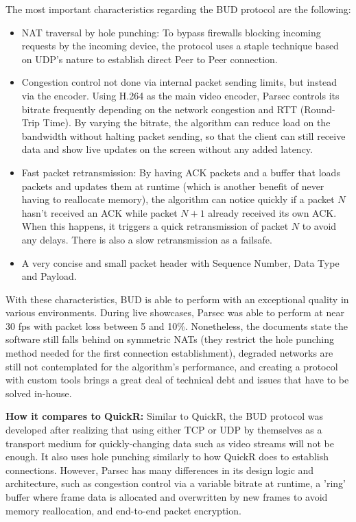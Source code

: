 \documentclass{article}
\begin{document}
        The most important characteristics regarding the BUD protocol are the following:
        \begin{itemize}
            \item NAT traversal by hole punching: To bypass firewalls blocking incoming requests by the incoming device, the protocol uses a staple technique based on UDP's nature to establish direct Peer to Peer connection.
            \item Congestion control not done via internal packet sending limits, but instead via the encoder. Using H.264 as the main video encoder, Parsec controls its bitrate frequently depending on the network congestion and RTT (Round-Trip Time). 
            By varying the bitrate, the algorithm can reduce load on the bandwidth without halting packet sending, so that the client can still receive data and show live updates on the screen without any added latency. 
            \item Fast packet retransmission: By having ACK packets and a buffer that loads packets and updates them at runtime (which is another benefit of never having to reallocate memory), the algorithm can notice quickly if a packet $N$ hasn't received an ACK while packet $N+1$ already received
            its own ACK. When this happens, it triggers a quick retransmission of packet $N$ to avoid any delays. There is also a slow retransmission as a failsafe.
            \item A very concise and small packet header with Sequence Number, Data Type and Payload.
        \end{itemize}
        With these characteristics, BUD is able to perform with an exceptional quality in various environments. During live showcases, Parsec was able to perform at near 30 fps with packet loss between 5 and 10\%. Nonetheless, the documents state the software still falls behind on
        symmetric NATs (they restrict the hole punching method needed for the first connection establishment), degraded networks are still not contemplated for the algorithm's performance, and creating a protocol with custom tools brings a great deal of technical debt and issues that have to be
        solved in-house.  

        \textbf{How it compares to QuickR:} Similar to QuickR, the BUD protocol was developed after realizing that using either TCP or UDP by themselves as a transport medium for quickly-changing data such as video streams will not be enough. It also uses hole punching similarly to how QuickR does to establish connections.
        However, Parsec has many differences in its design logic and architecture, such as congestion control via a variable bitrate at runtime, a 'ring' buffer where frame data is allocated and overwritten by new frames to avoid memory reallocation, and end-to-end packet encryption.  
\end{document}
